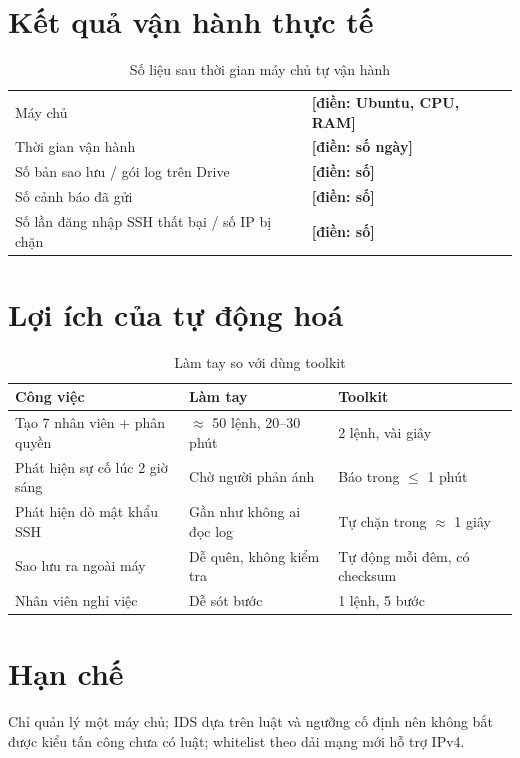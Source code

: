 \documentclass[12pt,a4paper,oneside]{report}
\newcommand{\dien}[1]{\colorbox{amber!35}{\sffamily\small\textbf{[điền: #1]}}}
\begin{document}
\section{Kết quả vận hành thực tế}
\begin{table}[H]\centering\small
\caption{Số liệu sau thời gian máy chủ tự vận hành}
\begin{tabularx}{\textwidth}{>{\raggedright\arraybackslash}p{6.8cm}L}\toprule
Máy chủ & \dien{Ubuntu, CPU, RAM}\\
Thời gian vận hành & \dien{số ngày}\\
Số bản sao lưu / gói log trên Drive & \dien{số}\\
Số cảnh báo đã gửi & \dien{số}\\
Số lần đăng nhập SSH thất bại / số IP bị chặn & \dien{số}\\\bottomrule
\end{tabularx}
\end{table}

\section{Lợi ích của tự động hoá}
\begin{table}[H]\centering\small
\caption{Làm tay so với dùng toolkit}
\begin{tabularx}{\textwidth}{>{\raggedright\arraybackslash}p{4.4cm}>{\raggedright\arraybackslash}p{4.4cm}L}\toprule
\textbf{Công việc} & \textbf{Làm tay} & \textbf{Toolkit}\\\midrule
Tạo 7 nhân viên + phân quyền & $\approx$ 50 lệnh, 20–30 phút & 2 lệnh, vài giây\\
Phát hiện sự cố lúc 2 giờ sáng & Chờ người phản ánh & Báo trong $\le$ 1 phút\\
Phát hiện dò mật khẩu SSH & Gần như không ai đọc log & Tự chặn trong $\approx$ 1 giây\\
Sao lưu ra ngoài máy & Dễ quên, không kiểm tra & Tự động mỗi đêm, có checksum\\
Nhân viên nghỉ việc & Dễ sót bước & 1 lệnh, 5 bước\\\bottomrule
\end{tabularx}
\end{table}

\section{Hạn chế}
Chỉ quản lý một máy chủ; IDS dựa trên luật và ngưỡng cố định nên không bắt được kiểu tấn công chưa có luật; whitelist theo dải mạng mới hỗ trợ IPv4.
\end{document}
